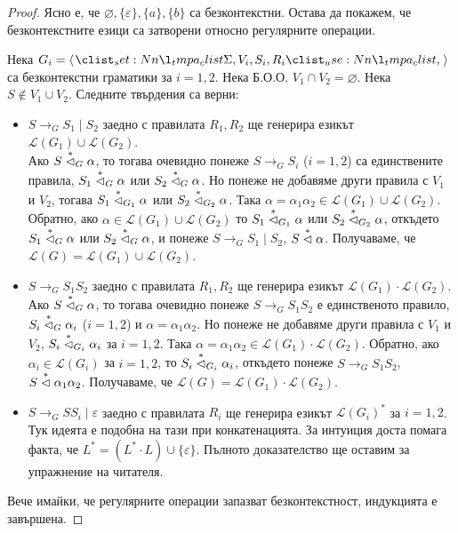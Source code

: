 \begin{proof}
    Ясно е, че $\varnothing, \{ \varepsilon \}, \{ a \}, \{ b \}$ са безконтекстни.
    Остава да покажем, че безконтекстните езици са затворени относно регулярните операции.

    Нека $G_i = \opair{\Sigma, V_i, S_i, R_i}$ са безконтекстни граматики за $i = 1, 2$.
    Нека Б.О.О. $V_1 \cap V_2 = \varnothing$.
    Нека $S \notin V_1 \cup V_2$.
    Следните твърдения са верни:
    \begin{itemize}
        \item $S \rightarrow_G S_1 \mid S_2$ заедно с правилата $R_1, R_2$ ще генерира езикът $\mathcal{L}(G_1) \cup \mathcal{L}(G_2)$. \\
              Ако $S \stackrel{*}{\vartriangleleft}_G \alpha$, то тогава очевидно понеже $S \rightarrow_G S_i$ ($i = 1, 2$) са единствените правила, $S_1 \stackrel{*}{\vartriangleleft}_G \alpha$ или $S_2 \stackrel{*}{\vartriangleleft}_G \alpha$.
              Но понеже не добавяме други правила с $V_1$ и $V_2$, тогава $S_1 \stackrel{*}{\vartriangleleft}_{G_1} \alpha$ или $S_2 \stackrel{*}{\vartriangleleft}_{G_2} \alpha$.
              Така $\alpha = \alpha_1 \alpha_2 \in \mathcal{L}(G_1) \cup \mathcal{L}(G_2)$.
              Обратно, ако $\alpha \in \mathcal{L}(G_1) \cup \mathcal{L}(G_2)$ то $S_1 \stackrel{*}{\vartriangleleft}_{G_1} \alpha$ или $S_2 \stackrel{*}{\vartriangleleft}_{G_2} \alpha$, откъдето $S_1 \stackrel{*}{\vartriangleleft}_G \alpha$ или $S_2 \stackrel{*}{\vartriangleleft}_G \alpha$, и понеже $S \rightarrow_G S_1 \mid S_2$, $S \stackrel{*}{\vartriangleleft} \alpha$.
              Получаваме, че $\mathcal{L}(G) = \mathcal{L}(G_1) \cup \mathcal{L}(G_2)$.
        \item $S \rightarrow_G S_1 S_2$ заедно с правилата $R_1, R_2$ ще генерира езикът $\mathcal{L}(G_1) \cdot \mathcal{L}(G_2)$. \\
              Ако $S \stackrel{*}{\vartriangleleft}_G \alpha$, то тогава очевидно понеже $S \rightarrow_G S_1 S_2$ е единственото правило, $S_i \stackrel{*}{\vartriangleleft}_G \alpha_i$ ($i = 1, 2$) и $\alpha = \alpha_1 \alpha_2$.
              Но понеже не добавяме други правила с $V_1$ и $V_2$, $S_i \stackrel{*}{\vartriangleleft}_{G_i} \alpha_i$ за $i = 1, 2$.
              Така $\alpha = \alpha_1 \alpha_2 \in \mathcal{L}(G_1) \cdot \mathcal{L}(G_2)$.
              Обратно, ако $\alpha_i \in \mathcal{L}(G_i)$ за $i = 1, 2$, то $S_i \stackrel{*}{\vartriangleleft}_{G_i} \alpha_i$, откъдето понеже $S \rightarrow_G S_1 S_2$, $S \stackrel{*}{\vartriangleleft} \alpha_1 \alpha_2$.
              Получаваме, че $\mathcal{L}(G) = \mathcal{L}(G_1) \cdot \mathcal{L}(G_2)$.
        \item $S \rightarrow_G S S_i \mid \varepsilon$ заедно с правилата $R_i$ ще генерира езикът $\mathcal{L}(G_i)^*$ за $i = 1, 2$. \\
              Тук идеята е подобна на тази при конкатенацията.
              За интуиция доста помага факта, че $L^* = (L^* \cdot L) \cup \{ \varepsilon \}$.
              Пълното доказателство ще оставим за упражнение на читателя.
    \end{itemize}

    Вече имайки, че регулярните операции запазват безконтекстност, индукцията е завършена.
\end{proof}

